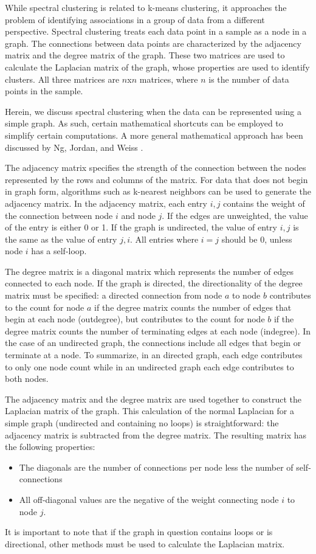 While spectral clustering is related to k-means clustering, it approaches the problem of identifying associations in a group of data from a different perspective. Spectral clustering treats each data point in a sample as a node in a graph. The connections between data points are characterized by the adjacency matrix and the degree matrix of the graph. These two matrices are used to calculate the Laplacian matrix of the graph, whose properties are used to identify clusters. All three matrices are $n$x$n$ matrices, where $n$ is the number of data points in the sample. 

Herein, we discuss spectral clustering when the data can be represented using a simple graph. As such, certain mathematical shortcuts can be employed to simplify certain computations. A more general mathematical approach has been discussed by Ng, Jordan, and Weiss \cite{Ng2002}.

The adjacency matrix specifies the strength of the connection between the nodes represented by the rows and columns of the matrix. For data that does not begin in graph form, algorithms such as k-nearest neighbors can be used to generate the adjacency matrix. In the adjacency matrix, each entry $i, j$ contains the weight of the connection between node $i$ and node $j$. If the edges are unweighted, the value of the entry is either 0 or 1. If the graph is undirected, the value of entry $i, j$ is the same as the value of entry $j, i$. All entries where $i=j$ should be 0, unless node $i$ has a self-loop.

The degree matrix is a diagonal matrix which represents the number of edges connected to each node. If the graph is directed, the directionality of the degree matrix must be specified: a directed connection from node $a$ to node $b$ contributes to the count for node $a$ if the degree matrix counts the number of edges that begin at each node (outdegree), but contributes to the count for node $b$ if the degree matrix counts the number of terminating edges at each node (indegree). In the case of an undirected graph, the connections include all edges that begin or terminate at a node. To summarize, in an directed graph, each edge contributes to only one node count while in an undirected graph each edge contributes to both nodes.

The adjacency matrix and the degree matrix are used together to construct the Laplacian matrix of the graph. This calculation of the normal Laplacian for a simple graph (undirected and containing no loops) is straightforward: the adjacency matrix is subtracted from the degree matrix. The resulting matrix has the following properties:
\begin{itemize}
\item The diagonals are the number of connections per node less the number of self-connections
\item All off-diagonal values are the negative of the weight connecting node $i$ to node $j$.
\end{itemize}
It is important to note that if the graph in question contains loops or is directional, other methods must be used to calculate the Laplacian matrix. 

